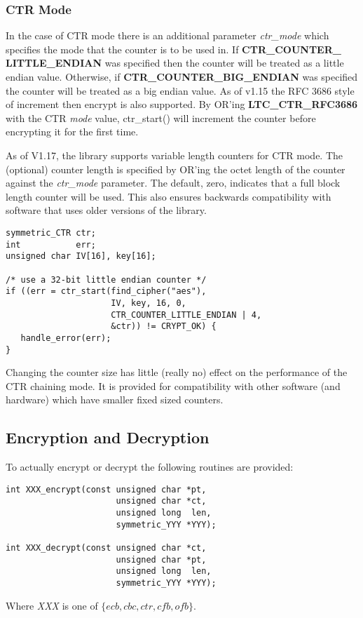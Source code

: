 \documentclass[synpaper]{book}
\begin{document}
\subsubsection{CTR Mode}
In the case of CTR mode there is an additional parameter \textit{ctr\_mode} which specifies the mode that the counter is to be used in.
If \textbf{CTR\_COUNTER\_ LITTLE\_ENDIAN} was specified then the counter will be treated as a little endian value.  Otherwise, if 
\textbf{CTR\_COUNTER\_BIG\_ENDIAN} was specified the counter will be treated as a big endian value.  As of v1.15 the RFC 3686 style of
increment then encrypt is also supported.  By OR'ing \textbf{LTC\_CTR\_RFC3686} with the CTR \textit{mode} value, ctr\_start() will increment
the counter before encrypting it for the first time.

As of V1.17, the library supports variable length counters for CTR mode.  The (optional) counter length is specified by OR'ing the octet
length of the counter against the \textit{ctr\_mode} parameter.  The default, zero, indicates that a full block length counter will be used.  This also
ensures backwards compatibility with software that uses older versions of the library.

\begin{small}
\begin{verbatim}
symmetric_CTR ctr;
int           err;
unsigned char IV[16], key[16];

/* use a 32-bit little endian counter */
if ((err = ctr_start(find_cipher("aes"),
                     IV, key, 16, 0,
                     CTR_COUNTER_LITTLE_ENDIAN | 4, 
                     &ctr)) != CRYPT_OK) {
   handle_error(err);
}
\end{verbatim}
\end{small}

Changing the counter size has little (really no) effect on the performance of the CTR chaining mode.  It is provided for compatibility
with other software (and hardware) which have smaller fixed sized counters.

\subsection{Encryption and Decryption}
To actually encrypt or decrypt the following routines are provided:
    
     
\begin{verbatim}
int XXX_encrypt(const unsigned char *pt, 
                      unsigned char *ct, 
                      unsigned long  len, 
                      symmetric_YYY *YYY);

int XXX_decrypt(const unsigned char *ct, 
                      unsigned char *pt, 
                      unsigned long  len, 
                      symmetric_YYY *YYY);
\end{verbatim}
Where \textit{XXX} is one of $\lbrace ecb, cbc, ctr, cfb, ofb \rbrace$.  
\end{document}
